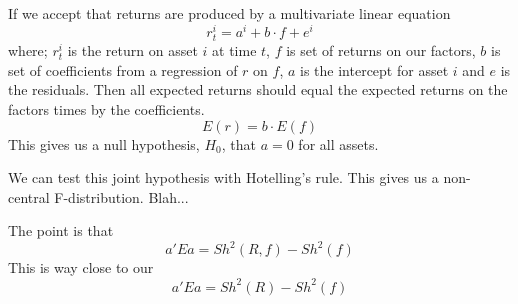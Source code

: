 
\subsection{\textcite{gibbons1989test}}

If we accept that returns are produced by a multivariate linear equation
\[
r^i_t = a^i + b\cdot f + e^i
\]
where; $r^i_t$ is the return on asset $i$ at time $t$, $f$ is set of returns on our factors, 
$b$ is set of coefficients from a regression of $r$ on $f$, $a$ is the intercept for asset $i$ 
and $e$ is the residuals.
Then all expected returns should equal the expected returns on the factors times by the 
coefficients.
\[
E(r) = b\cdot E(f)
\]
This gives us a null hypothesis, $H_0$, that $a=0$ for all assets.

We can test this joint hypothesis with Hotelling's rule.
This gives us a non-central F-distribution.
Blah...

The point is that
\[
a'Ea = Sh^2(R, f) - Sh^2(f)
\]
This is way close to our
\[
a'Ea = Sh^2(R) - Sh^2(f)
\]
